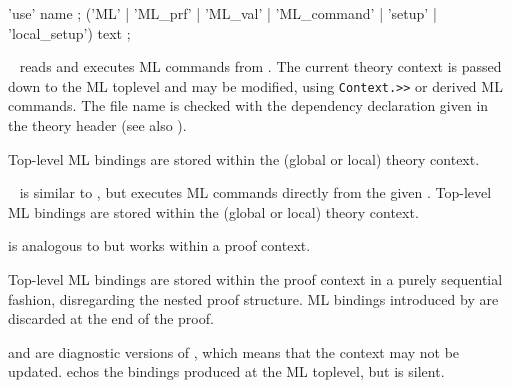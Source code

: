 \begin{isabellebody}
\begin{isamarkuptext}
  \begin{rail}
    'use' name
    ;
    ('ML' | 'ML\_prf' | 'ML\_val' | 'ML\_command' | 'setup' | 'local\_setup') text
    ;
  \end{rail}

  \begin{description}

  \item \hyperlink{command.use}{\mbox{}}~ reads and executes ML
  commands from .  The current theory context is passed
  down to the ML toplevel and may be modified, using \verb|Context.>>| or derived ML commands.  The file name is checked with
  the \hyperlink{keyword.uses}{\mbox{}} dependency declaration given in the theory
  header (see also ).

  Top-level ML bindings are stored within the (global or local) theory
  context.
  
  \item \hyperlink{command.ML}{\mbox{}}~ is similar to \hyperlink{command.use}{\mbox{}},
  but executes ML commands directly from the given .
  Top-level ML bindings are stored within the (global or local) theory
  context.

  \item \hyperlink{command.ML-prf}{\mbox{}} is analogous to \hyperlink{command.ML}{\mbox{}} but works
  within a proof context.

  Top-level ML bindings are stored within the proof context in a
  purely sequential fashion, disregarding the nested proof structure.
  ML bindings introduced by \hyperlink{command.ML-prf}{\mbox{}} are discarded at the
  end of the proof.

  \item \hyperlink{command.ML-val}{\mbox{}} and \hyperlink{command.ML-command}{\mbox{}} are diagnostic
  versions of \hyperlink{command.ML}{\mbox{}}, which means that the context may not be
  updated.  \hyperlink{command.ML-val}{\mbox{}} echos the bindings produced at the ML
  toplevel, but \hyperlink{command.ML-command}{\mbox{}} is silent.
  

\end{description}
\end{isamarkuptext}
\end{isabellebody}
